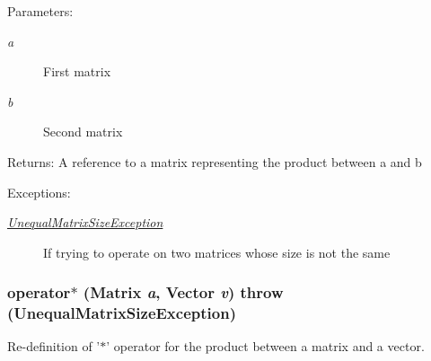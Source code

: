 \begin{Desc}
\item[Parameters:]
\begin{description}
\item[{\em a}]First matrix \item[{\em b}]Second matrix \end{description}
\end{Desc}
\begin{Desc}
\item[Returns:]A reference to a matrix representing the product between a and b \end{Desc}
\begin{Desc}
\item[Exceptions:]
\begin{description}
\item[{\em \hyperlink{classgrassmann_1_1UnequalMatrixSizeException}{UnequalMatrixSizeException}}]If trying to operate on two matrices whose size is not the same \end{description}
\end{Desc}
\hypertarget{classgrassmann_1_1Matrix_5366f970d50d2681696cb03ce1df4cef}{
\subsubsection[operator$\ast$]{ operator$\ast$ ({\bf Matrix} {\em a}, \/  {\bf Vector} {\em v})  throw ({\bf UnequalMatrixSizeException})}}
\label{classgrassmann_1_1Matrix_5366f970d50d2681696cb03ce1df4cef}


Re-definition of '$\ast$' operator for the product between a matrix and a vector. 

